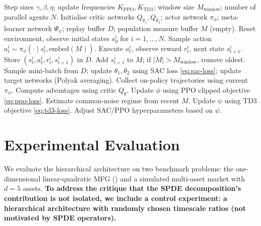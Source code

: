 \begin{algorithm}[ht]
\caption{Hierarchical SAC-PPO-TD3 for Common-Noise MFG}
\label{alg:hierarchical-sac-ppo-td3}
\begin{algorithmic}[1]
\Require Step sizes $\gamma, \beta, \eta$; update frequencies $K_{\mathrm{PPO}},
    K_{\mathrm{TD3}}$; window size $M_{\mathrm{window}}$; number of parallel agents
    $N$.
\State Initialise critic networks $Q_{\theta_1}, Q_{\theta_2}$; actor network
    $\pi_\phi$; meta-learner network $\Psi_\psi$; replay buffer $D$; population
    measure buffer $M$ (empty).
    \State Reset environment, observe initial states $s_0^i$ for $i = 1, \dots, N$.
            \State Sample action $a_t^i \sim \pi_\phi(\cdot \mid s_t^i,
                \mathrm{embed}(M))$.
            \State Execute $a_t^i$, observe reward $r_t^i$, next state $s_{t+1}^i$.
            \State Store $(s_t^i, a_t^i, r_t^i, s_{t+1}^i)$ in $D$.
            \State Add $s_{t+1}^i$ to $M$; if $|M| > M_{\mathrm{window}}$, remove
                oldest.
            \State Sample mini-batch from $D$; update $\theta_1, \theta_2$ using SAC
                loss \eqref{eq:sac-loss}; update target networks (Polyak averaging).
        \EndFor
            \State Collect on-policy trajectories using current $\pi_\phi$.
            \State Compute advantages using critic $Q_\theta$.
            \State Update $\phi$ using PPO clipped objective \eqref{eq:ppo-loss}.
        \EndIf
            \State Estimate common-noise regime from recent $M$.
            \State Update $\psi$ using TD3 objective \eqref{eq:td3-loss}.
            \State Adjust SAC/PPO hyperparameters based on $\psi$.
        \EndIf
    \EndFor
\EndFor
\end{algorithmic}
\end{algorithm}


\section{Experimental Evaluation}
\label{sec:hrl-experiments}

We evaluate the hierarchical architecture on two benchmark problems: the
one-dimensional linear-quadratic MFG () and a simulated multi-asset
market with $d=5$ assets. \textbf{To address the critique that the SPDE
decomposition's contribution is not isolated, we include a control experiment: a
hierarchical architecture with randomly chosen timescale ratios (not motivated by
SPDE operators).}

